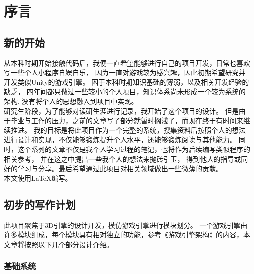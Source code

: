 \maketitle
\chapter{序言}

\section{新的开始}

从本科时期开始接触代码后，我便一直希望能够进行自己的项目开发，日常也喜欢写一些个人小程序自娱自乐，
因为一直对游戏较为感兴趣，因此初期希望研究并开发类似Unity的游戏引擎。
困于本科时期知识基础的薄弱，以及相关开发经验的缺乏，
四年间都只做过一些较小的个人项目，知识体系尚未形成一个较为系统的架构,
没有将个人的思想融入到项目中实现。\\

研究生阶段，为了能够对读研生涯进行记录，我开始了这个项目的设计。
但是由于毕业与工作的压力，之前的文章写了部分就暂时搁浅了，而现在终于有时间来继续推进。
我的目标是将此项目作为一个完整的系统，搜集资料后按照个人的想法进行设计和实现，不仅能够锻炼提升个人水平，还能够锻炼阅读与其他能力。
同时，这个系列的文章不仅是我个人学习过程的笔记，也将作为后续编写类似程序的相关参考，
并在这之中提出一些我个人的想法来抛砖引玉，
得到他人的指导或同好的学习与分享。最后希望通过此项目对相关领域做出一些微薄的贡献。\\

本文使用\LaTeX{}编写。

\maketitle
\section{初步的写作计划}

此项目聚焦于3D引擎的设计开发，模仿游戏引擎进行模块划分。
一个游戏引擎由许多模块组成，每个模块具有相对独立的功能，参考《游戏引擎架构》的内容，本文章将按照以下几个部分设计介绍。

\maketitle
\subsection{基础系统}

